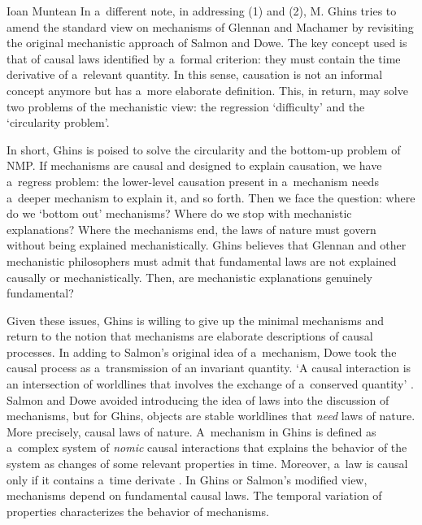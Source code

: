\begin{recengenv}{Ioan Muntean}
In a~different note, in addressing (1) and (2), M. Ghins tries to amend the standard view on mechanisms of Glennan and Machamer by revisiting the original mechanistic approach of Salmon and Dowe. The key concept used is that of causal laws identified by a~formal criterion: they must contain the time derivative of a~relevant quantity. In this sense, causation is not an informal concept anymore but has a~more elaborate definition. This, in return, may solve two problems of the mechanistic view: the regression ‘difficulty' and the ‘circularity problem'.

In short, Ghins is poised to solve the circularity and the bottom-up problem of NMP. If mechanisms are causal and designed to explain causation, we have a~regress problem: the lower-level causation present in a~mechanism needs a~deeper mechanism to explain it, and so forth. Then we face the question: where do we ‘bottom out' mechanisms? Where do we stop with mechanistic explanations?
\parencite*[][p.99]{falkenburg_mechanistic_2019} %
 Where the mechanisms end, the laws of nature must govern without being explained mechanistically. Ghins believes that Glennan and other mechanistic philosophers must admit that fundamental laws are not explained causally or mechanistically. Then, are mechanistic explanations genuinely fundamental?

Given these issues, Ghins is willing to give up the minimal mechanisms and return to the notion that mechanisms are elaborate descriptions of causal processes. In adding to Salmon's original idea of a~mechanism, Dowe took the causal process as a~transmission of an invariant quantity. ‘A causal interaction is an intersection of worldlines that involves the exchange of a~conserved quantity'
\parencite*[][p.103]{falkenburg_mechanistic_2019}. %
 Salmon and Dowe avoided introducing the idea of laws into the discussion of mechanisms, but for Ghins, objects are stable worldlines that \textit{need} laws of nature. More precisely, causal laws of nature. A~mechanism in Ghins is defined as a~complex system of \textit{nomic} causal interactions that explains the behavior of the system as changes of some relevant properties in time. Moreover, a~law is causal only if it contains a~time derivate 
\parencite*[][p.106]{falkenburg_mechanistic_2019}. %
 In Ghins or Salmon's modified view, mechanisms depend on fundamental causal laws. The temporal variation of properties characterizes the behavior of mechanisms.


\end{recengenv}
